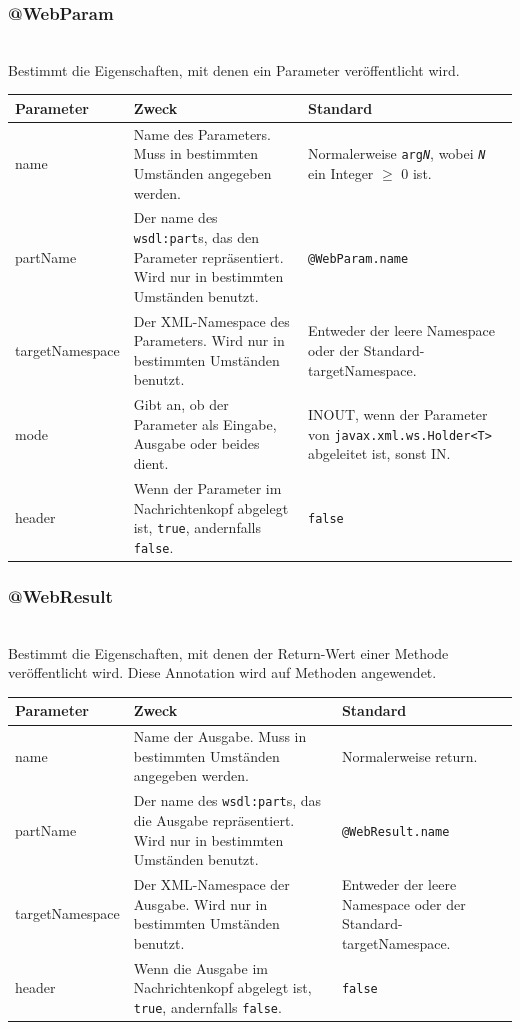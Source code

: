\documentclass[runningheads]{llncs}
\newcommand{\germanquote}[1]{\glqq{}#1\grqq{}}
\newcommand{\anntabwidth}{\textwidth}
\begin{document}
    \subsubsection{@WebParam}\ \\
      Bestimmt die Eigenschaften, mit denen ein Parameter veröffentlicht wird.\\
    \begin{tabulary}{\anntabwidth}{|l|L|L|}
    \hline
    \textbf{Parameter} & \textbf{Zweck} & \textbf{Standard} \\
    \hline
      name &
      Name des Parameters. Muss in bestimmten Umständen angegeben werden. &
      Normalerweise \texttt{arg\textit{N}}, wobei \texttt{\textit{N}} ein Integer $\geq$ 0 ist. \\
    \hline
      partName &
      Der name des \texttt{wsdl:part}s, das den Parameter repräsentiert. Wird nur in bestimmten Umständen benutzt. &
      \texttt{@WebParam.name} \\
    \hline
      targetNamespace &
      Der XML-Namespace des Parameters. Wird nur in bestimmten Umständen benutzt. &
      Entweder der leere Namespace oder der Standard-targetNamespace. \\
    \hline
      mode &
      Gibt an, ob der Parameter als Eingabe, Ausgabe oder beides dient. &
      INOUT, wenn der Parameter von \texttt{javax.xml.ws.Holder<T>} abgeleitet ist, sonst IN. \\
    \hline
      header &
      Wenn der Parameter im Nachrichtenkopf abgelegt ist, \texttt{true}, andernfalls \texttt{false}. &
      \texttt{false} \\
    \hline
    \end{tabulary}

    \subsubsection{@WebResult}\ \\
      Bestimmt die Eigenschaften, mit denen der Return-Wert einer Methode veröffentlicht wird. Diese Annotation wird auf Methoden angewendet.\\
    \begin{tabulary}{\anntabwidth}{|l|L|L|}
    \hline
    \textbf{Parameter} & \textbf{Zweck} & \textbf{Standard} \\
    \hline
      name &
      Name der Ausgabe. Muss in bestimmten Umständen angegeben werden. &
      Normalerweise \germanquote{return}. \\
    \hline
      partName &
      Der name des \texttt{wsdl:part}s, das die Ausgabe repräsentiert. Wird nur in bestimmten Umständen benutzt. &
      \texttt{@WebResult.name} \\
    \hline
      targetNamespace &
      Der XML-Namespace der Ausgabe. Wird nur in bestimmten Umständen benutzt. &
      Entweder der leere Namespace oder der Standard-targetNamespace. \\
    \hline
      header &
      Wenn die Ausgabe im Nachrichtenkopf abgelegt ist, \texttt{true}, andernfalls \texttt{false}. &
      \texttt{false} \\
    \hline
    \end{tabulary}
\end{document}
